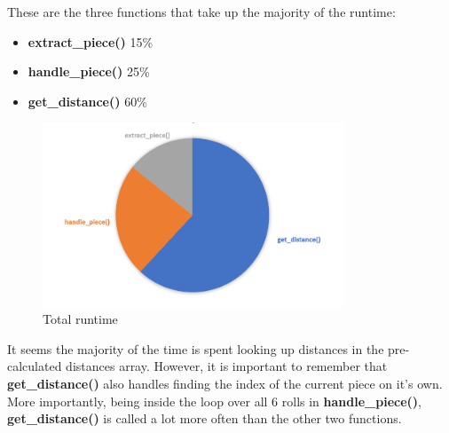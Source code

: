 \documentclass[12pt]{article}
\begin{document}
These are the three functions that take up the majority of the runtime:

\begin{itemize}
	\item \textbf{extract\_piece()} 15\%
	\item \textbf{handle\_piece()} 25\%
	\item \textbf{get\_distance()} 60\%
\end{itemize}

\begin{figure}[htbp]
    \centering
    \includegraphics[width=0.8\textwidth]{images/Figure16}
    \caption{Total runtime}
    \label{fig:runtime-diagram}
\end{figure}

It seems the majority of the time is spent looking up distances in the pre-calculated distances array. However, it is important to remember that \textbf{get\_distance()} also handles finding the index of the current piece on it's own. More importantly, being inside the loop over all 6 rolls in \textbf{handle\_piece()}, \textbf{get\_distance()} is called a lot more often than the other two functions.
\end{document}
